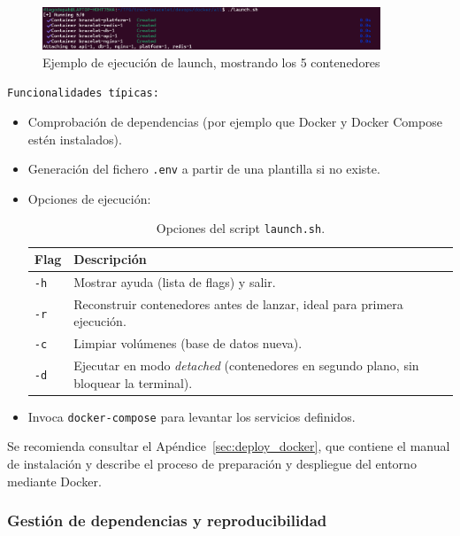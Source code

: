 \documentclass[12pt, a4paper]{article}
\begin{document}
\begin{figure}[htbp]
	\centering
	\includegraphics[width=0.9\textwidth]{images/ejemplo_launch.png}
	\caption[launch]{Ejemplo de ejecución de launch, mostrando los 5 contenedores}
	\label{fig:launch}
\end{figure}

\texttt{Funcionalidades típicas:}
\begin{itemize}
	\item Comprobación de dependencias (por ejemplo que Docker y Docker Compose estén instalados).
	\item Generación del fichero \texttt{.env} a partir de una plantilla si no existe.
	\item Opciones de ejecución:
	
	\begin{table}[ht]
		\centering
		\begin{tabular}{@{}ll@{}}
			\toprule
			\textbf{Flag} & \textbf{Descripción} \\
			\midrule
			\texttt{-h} & Mostrar ayuda (lista de flags) y salir. \\
			\texttt{-r} & Reconstruir contenedores antes de lanzar, ideal para primera ejecución. \\
			\texttt{-c} & Limpiar volúmenes (base de datos nueva). \\
			\texttt{-d} & Ejecutar en modo \emph{detached} (contenedores en segundo plano, sin bloquear la terminal). \\
			\bottomrule
		\end{tabular}
		\caption{Opciones del script \texttt{launch.sh}.}
		\label{tab:launch_flags}
	\end{table}
	
	\item Invoca \texttt{docker-compose} para levantar los servicios definidos.
\end{itemize}

Se recomienda consultar el Apéndice~\ref{sec:deploy_docker}, que contiene el manual de instalación y describe el proceso de preparación y despliegue del entorno mediante Docker.

\subsubsection{Gestión de dependencias y reproducibilidad}
\end{document}
